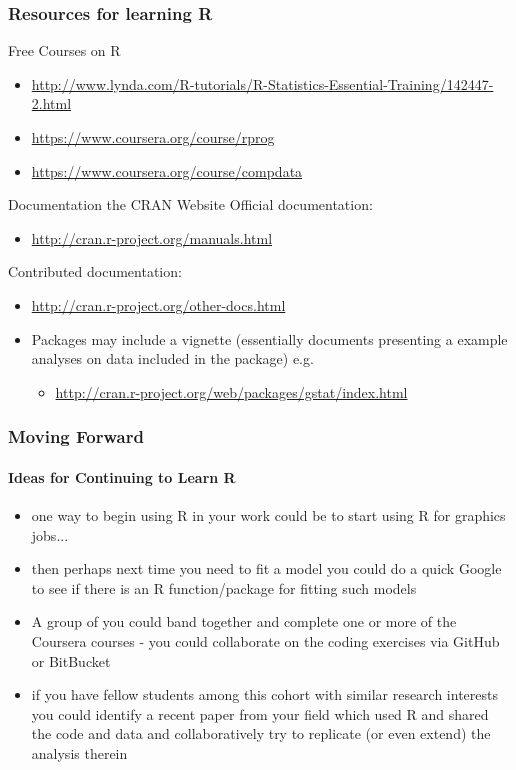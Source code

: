 \documentclass[xcolor=dvipsnames]{beamer}
\begin{document}
\begin{frame}
\frametitle{Resources for learning R}

\begin{block}{Free Courses on R}
\begin{itemize}
\item \small \url{http://www.lynda.com/R-tutorials/R-Statistics-Essential-Training/142447-2.html}
\item \small \url{https://www.coursera.org/course/rprog}
\item \small \url{https://www.coursera.org/course/compdata}
\end{itemize}
\end{block}

\begin{block}{Documentation the CRAN Website}
Official documentation: \begin{itemize}
\item \small \url{http://cran.r-project.org/manuals.html}
\end{itemize}

Contributed documentation: \begin{itemize}
\item \small \url{http://cran.r-project.org/other-docs.html} \end{itemize}
\begin{itemize}
\item Packages may include a vignette (essentially documents presenting a example analyses on data included in the package) e.g. \begin{itemize}
 \item \small \url{http://cran.r-project.org/web/packages/gstat/index.html} \end{itemize}
\end{itemize}
\end{block}

\end{frame}

\begin{frame}
\frametitle{Moving Forward}
\framesubtitle{Ideas for Continuing to Learn R}

\begin{itemize}
\item one way to begin using R in your work could be to start using R for graphics jobs...
\newline
\item then perhaps next time you need to fit a model you could do a quick Google to see if there is an R function/package for fitting such models
\newline
\item A group of you could band together and complete one or more of the Coursera courses - you could collaborate on the coding exercises via GitHub or BitBucket
\newline
\item if you have fellow students among this cohort with similar research interests you could identify a recent paper from your field which used R and shared the code and data and collaboratively try to replicate (or even extend) the analysis therein
\end{itemize}

\end{frame}
\end{document}
